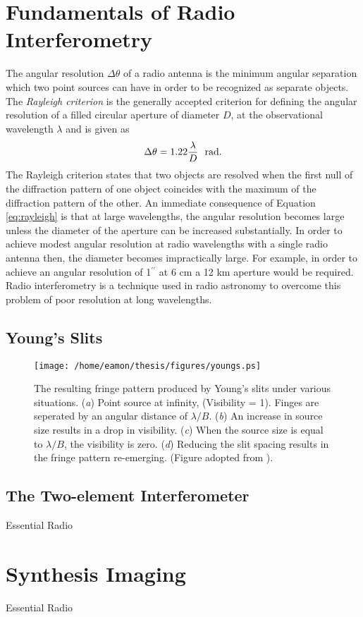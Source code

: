 \section{Fundamentals of Radio Interferometry}\label{sec:3}
The angular resolution $\Delta \theta$ of a radio antenna is the minimum angular separation which two point sources can have in order to be recognized as separate objects. The \textit{Rayleigh criterion} is the generally accepted criterion for defining the angular resolution of a filled circular aperture of diameter $D$, at the observational wavelength $\lambda$ and is given as
\begin{equation}
\Delta \theta=1.22\frac{\lambda}{D} \ \ \rm{rad}.
\label{eq:rayleigh}
\end{equation}
The Rayleigh criterion states that two objects are resolved when the first null of the diffraction pattern of one object coincides with the maximum of the diffraction pattern of the other. An immediate consequence of Equation \ref{eq:rayleigh} is that at large wavelengths, the angular resolution becomes large unless the diameter of the aperture can be increased substantially. In order to achieve modest angular resolution at radio wavelengths with a single radio antenna then, the diameter becomes impractically large. For example, in order to achieve an angular resolution of 1$^{\prime \prime}$ at 6 cm a 12 km aperture would be required. Radio interferometry is a technique used in radio astronomy to overcome this problem of poor resolution at long wavelengths. 


\subsection{Young's Slits}\label{subsec:4}
\begin{figure}[hbt!]
\centering 
          \texttt{[image: /home/eamon/thesis/figures/youngs.ps]}
\caption[Common optical systems used for radio antennas.]{The resulting fringe pattern produced by Young's slits under various situations. (\textit{a}) Point source at infinity, (Visibility = 1). Finges are seperated by an angular distance of $\lambda /B$. (\textit{b}) An increase in source size results in a drop in visibility. (\textit{c}) When the source size is equal to $\lambda /B$, the visibility is zero. (\textit{d}) Reducing the slit spacing results in the fringe pattern re-emerging. (Figure adopted from \cite{taylor_1999}).}
\label{fig2d}
\end{figure}
\subsection{The Two-element Interferometer}\label{subsec:5}
Essential Radio 
\section{Synthesis Imaging}\label{sec:4}
Essential Radio 